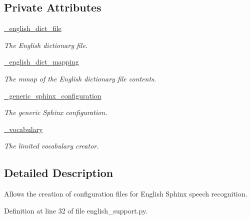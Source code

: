 \subsection*{Private Attributes}
\begin{DoxyCompactItemize}
\item 
\hyperlink{classrapp__speech__detection__sphinx4_1_1english__support_1_1EnglishSupport_a82ada1f7e06781ca0bd75c41319433f3}{\-\_\-english\-\_\-dict\-\_\-file}
\begin{DoxyCompactList}\small\item\em The English dictionary file. \end{DoxyCompactList}\item 
\hyperlink{classrapp__speech__detection__sphinx4_1_1english__support_1_1EnglishSupport_adaabe1ce40092eef99be9c2eec178f8d}{\-\_\-english\-\_\-dict\-\_\-mapping}
\begin{DoxyCompactList}\small\item\em The mmap of the English dictionary file contents. \end{DoxyCompactList}\item 
\hyperlink{classrapp__speech__detection__sphinx4_1_1english__support_1_1EnglishSupport_a3871c35fccf8b9c8ceb98a9763191132}{\-\_\-generic\-\_\-sphinx\-\_\-configuration}
\begin{DoxyCompactList}\small\item\em The generic Sphinx configuration. \end{DoxyCompactList}\item 
\hyperlink{classrapp__speech__detection__sphinx4_1_1english__support_1_1EnglishSupport_a9281d1138c5b2fa11d1e8f1899e81cbc}{\-\_\-vocabulary}
\begin{DoxyCompactList}\small\item\em The limited vocabulary creator. \end{DoxyCompactList}\end{DoxyCompactItemize}


\subsection{Detailed Description}
Allows the creation of configuration files for English Sphinx speech recognition. 

Definition at line 32 of file english\-\_\-support.\-py.



